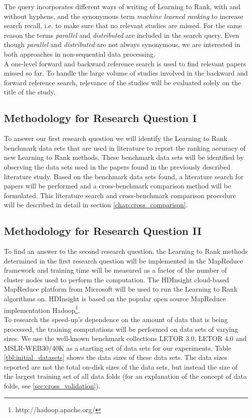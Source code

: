 The query incorporates different ways of writing of Learning to Rank, with and without hyphens, and the synonymous term \emph{machine learned ranking} to increase search recall, i.e. to make sure that no relevant studies are missed. For the same reason the terms \emph{parallel} and \emph{distributed} are included in the search query. Even though \emph{parallel} and \emph{distributed} are not always synonymous, we are interested in both approaches in non-sequential data processing.\\

A one-level forward and backward reference search is used to find relevant papers missed so far. To handle the large volume of studies involved in the backward and forward reference search, relevance of the studies will be evaluated solely on the title of the study.

\subsection{Methodology for Research Question I}
To answer our first research question we will identify the Learning to Rank benchmark data sets that are used in literature to report the ranking accuracy of new Learning to Rank methods. These benchmark data sets will be identified by observing the data sets used in the papers found in the previously described literature study. Based on the benchmark data sets found, a literature search for papers will be performed and a cross-benchmark comparison method will be formulated. This literature search and cross-benchmark comparison procedure will be described in detail in section \ref{chap:cross_comparison}.

\subsection{Methodology for Research Question II}
\label{ssec:rq2_methodology}
To find an answer to the second research question, the Learning to Rank methods determined in the first research question will be implemented in the MapReduce framework and training time will be measured as a factor of the number of cluster nodes used to perform the computation. The HDInsight cloud-based MapReduce platform from Microsoft will be used to run the Learning to Rank algorithms on. HDInsight is based on the popular open source MapReduce implementation Hadoop\footnote{http://hadoop.apache.org/}.\\

To research the speed-up's dependence on the amount of data that is being processed, the training computations will be performed on data sets of varying sizes. We use the well-known benchmark collections LETOR 3.0, LETOR 4.0 and MSLR-WEB30/40K as a starting set of data sets for our experiments. Table \ref{tbl:initial_datasets} shows the data sizes of these data sets. The data sizes reported are not the total on-disk sizes of the data sets, but instead the size of the largest training set of all data folds (for an explanation of the concept of data folds, see \ref{sec:cross_validation}).

